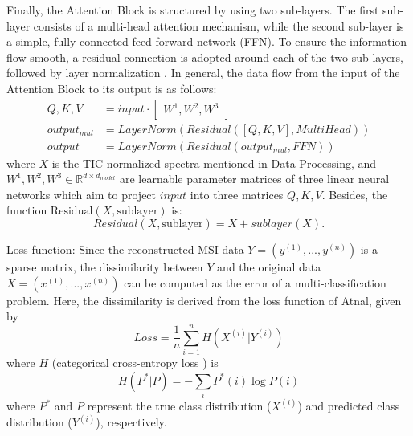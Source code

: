 \documentclass{WileyMSP-template}
\begin{document}
Finally, the Attention Block is structured by using two sub-layers. The first sub-layer 
consists of a multi-head attention mechanism, 
while the second sub-layer is a simple, fully connected feed-forward network (FFN). 
To ensure the information flow smooth, 
a residual connection \cite{he2016deep}  is adopted around each of the two sub-layers, 
followed by layer normalization \cite{hochreiter2001gradient}.
In general, the data flow from the input
of the Attention Block to its output is as follows:
\begin{align}
  Q,K,V &=  input \cdot \begin{bmatrix} W^1,W^2,W^3 \end{bmatrix} \\
  output_{mul} &=  LayerNorm( Residual([Q,K,V], MultiHead)) \\
  output &=  LayerNorm({Residual}( output_{mul}, FFN))
\end{align}
where $X $ is the TIC-normalized spectra mentioned in Data Processing, and $W^1,W^2,W^3 \in \mathbb{R}^{d \times d_{model}}$  
are learnable parameter matrices of three linear neural networks which aim to project 
$input$  into three matrices $Q,K,V$. 
Besides, the function $\mathrm{Residual}(X,\text{sublayer})$ is:
\begin{equation}
 Residual(X,\text{sublayer}) = X + sublayer(X). 
\end{equation}

Loss function: Since the reconstructed MSI data 
$Y = ( y^{(1)},...,y^{(n)})$ is a sparse matrix, 
the dissimilarity between $Y$ and the original data $X=( x^{(1)},...,x^{(n)})$ 
can be computed as the error of a multi-classification problem. 
Here, the dissimilarity is derived from the loss function of Atnal, given by 
\begin{equation}
  \text{$Loss$} =\frac{1}{n} \sum_{i=1}^{n}H(X^{(i)}|Y^{(i)})
  \label{eqn:loss function}
\end{equation}
where $H$ (categorical cross-entropy loss 
 \cite{kingma2013auto}) is
\begin{equation}
    H(P^{*}|P) = -\sum_{i}^{}P^{*}(i)\log P(i)  
\end{equation}
where $P^*$ and $P$ represent the true class distribution ($X^{(i)}$) and 
predicted class distribution ($Y^{(i)}$), respectively.
\end{document}
